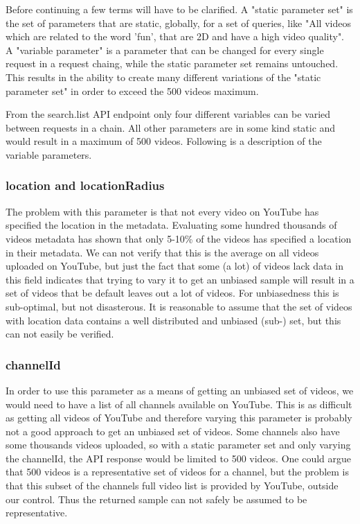 Before continuing a few terms will have to be clarified. A  "static parameter 
set" is the set of parameters that are static, globally, for a set of queries, 
like "All videos which are related to the word 'fun', that are 2D and have a 
high video quality". A "variable parameter" is a parameter that can be changed 
for every single request in a request chaing, while the static parameter set 
remains untouched. This results in the ability to create many different
variations of the "static parameter set" in order to exceed the 500 videos 
maximum.

From the search.list API endpoint only four different variables can be varied 
between requests in a chain. All other parameters are in some kind static and
would result in a maximum of 500 videos. Following is a description of the
variable parameters.

\subsubsection{location and locationRadius}
The problem with this parameter is that not every video on YouTube has specified
the location in the metadata. Evaluating some hundred thousands of videos
metadata has shown that only 5-10\% of the videos has specified a location in
their metadata. We can not verify that this is the average on all videos
uploaded on YouTube, but just the fact that some (a lot) of videos lack data in
this field indicates that trying to vary it to get an unbiased sample will
result in a set of videos that be default leaves out a lot of videos. For
unbiasedness this is sub-optimal, but not disasterous. It is reasonable to
assume that the set of videos with location data contains a well distributed
and unbiased (sub-) set, but this can not easily be verified.

\subsubsection{channelId}
In order to use this parameter as a means of getting an unbiased set of videos,
we would need to have a list of all channels available on YouTube. This is as
difficult as getting all videos of YouTube and therefore varying this parameter 
is probably not a good approach to get an unbiased set of videos. Some channels
also have some thousands videos uploaded, so with a static parameter set and
only varying the channelId, the API response would be limited to 500 videos. One
could argue that 500 videos is a representative set of videos for a channel, but
the problem is that this subset of the channels full video list is provided by
YouTube, outside our control. Thus the returned sample can not safely be assumed
to be representative.

